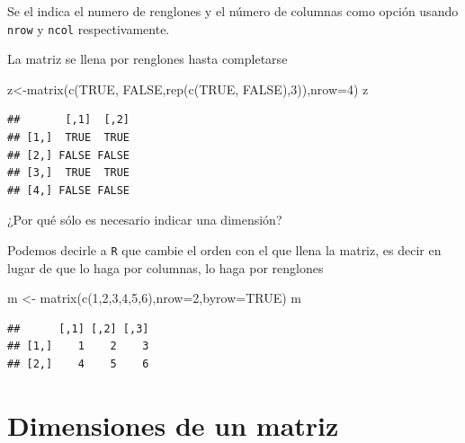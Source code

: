 \documentclass[
]{book}
\newenvironment{Shaded}{\begin{snugshade}}{\end{snugshade}}
\newcommand{\AttributeTok}[1]{\textcolor[rgb]{0.77,0.63,0.00}{#1}}
\newcommand{\ConstantTok}[1]{\textcolor[rgb]{0.00,0.00,0.00}{#1}}
\newcommand{\DecValTok}[1]{\textcolor[rgb]{0.00,0.00,0.81}{#1}}
\newcommand{\FunctionTok}[1]{\textcolor[rgb]{0.00,0.00,0.00}{#1}}
\newcommand{\NormalTok}[1]{#1}
\newcommand{\OtherTok}[1]{\textcolor[rgb]{0.56,0.35,0.01}{#1}}
\begin{document}
Se el indica el numero de renglones y el número de columnas como opción usando \texttt{nrow} y \texttt{ncol} respectivamente.

La matriz se llena por renglones hasta completarse

\begin{Shaded}
\begin{Highlighting}[]
\NormalTok{z}\OtherTok{\textless{}{-}}\FunctionTok{matrix}\NormalTok{(}\FunctionTok{c}\NormalTok{(}\ConstantTok{TRUE}\NormalTok{, }\ConstantTok{FALSE}\NormalTok{,}\FunctionTok{rep}\NormalTok{(}\FunctionTok{c}\NormalTok{(}\ConstantTok{TRUE}\NormalTok{, }\ConstantTok{FALSE}\NormalTok{),}\DecValTok{3}\NormalTok{)),}\AttributeTok{nrow=}\DecValTok{4}\NormalTok{)}
\NormalTok{z}
\end{Highlighting}
\end{Shaded}

\begin{verbatim}
##       [,1]  [,2]
## [1,]  TRUE  TRUE
## [2,] FALSE FALSE
## [3,]  TRUE  TRUE
## [4,] FALSE FALSE
\end{verbatim}

¿Por qué sólo es necesario indicar una dimensión?

Podemos decirle a \texttt{R} que cambie el orden con el que llena la matriz, es decir en lugar de que lo haga por columnas, lo haga por renglones

\begin{Shaded}
\begin{Highlighting}[]
\NormalTok{m }\OtherTok{\textless{}{-}} \FunctionTok{matrix}\NormalTok{(}\FunctionTok{c}\NormalTok{(}\DecValTok{1}\NormalTok{,}\DecValTok{2}\NormalTok{,}\DecValTok{3}\NormalTok{,}\DecValTok{4}\NormalTok{,}\DecValTok{5}\NormalTok{,}\DecValTok{6}\NormalTok{),}\AttributeTok{nrow=}\DecValTok{2}\NormalTok{,}\AttributeTok{byrow=}\ConstantTok{TRUE}\NormalTok{)}
\NormalTok{m}
\end{Highlighting}
\end{Shaded}

\begin{verbatim}
##      [,1] [,2] [,3]
## [1,]    1    2    3
## [2,]    4    5    6
\end{verbatim}

\hypertarget{dimensiones-de-un-matriz}{%
\section{Dimensiones de un matriz}\label{dimensiones-de-un-matriz}}
\end{document}
